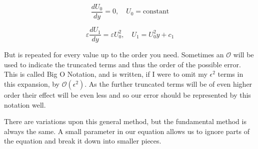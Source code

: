 \documentclass{article}
\begin{document}
\begin{equation}
    \frac{dU_0}{dy} = 0, \quad U_0 = \text{constant}
    \label{eq:U0}
\end{equation}

\begin{equation}
    \varepsilon \frac{dU_1}{dy} = \varepsilon U_0^2, \quad U_1 = U_0^2 y + c_1
    \label{eq:U1}
\end{equation}
\par But is repeated for every value up to the order you need. Sometimes an $\mathcal{O}$ will be used to indicate the truncated terms and thus the order of the possible error. This is called Big O Notation, and is written, if I were to omit my $\epsilon^2$ terms in this expansion, by $\mathcal{O}(\epsilon^2)$. As the further truncated terms will be of even higher order their effect will be even less and so our error should be represented by this notation well.
\par There are variations upon this general method, but the fundamental method is always the same. A small parameter in our equation allows us to ignore parts of the equation and break it down into smaller pieces. 
\end{document}
